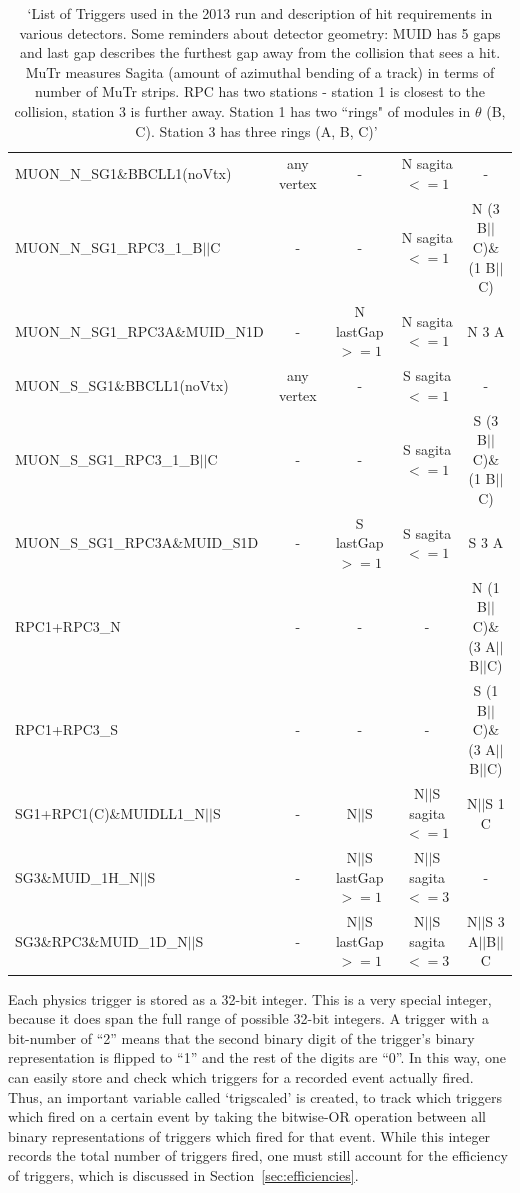 \begin{table}
{\begin{tabular}{l c c c c}
      MUON\_N\_SG1\&BBCLL1(noVtx) & any vertex & - & N sagita $<= 1$ & - \\
      MUON\_N\_SG1\_RPC3\_1\_B$||$C & - & - & N sagita $<= 1$ & N (3 B$||$C)\&(1 B$||$C) \\
      MUON\_N\_SG1\_RPC3A\&MUID\_N1D & - & N lastGap $>= 1$ & N sagita $<= 1$ & N 3 A \\
      MUON\_S\_SG1\&BBCLL1(noVtx) & any vertex & - & S sagita $<= 1$ & - \\
      MUON\_S\_SG1\_RPC3\_1\_B$||$C & - & - & S sagita $<= 1$ & S (3 B$||$C)\&(1 B$||$C) \\
      MUON\_S\_SG1\_RPC3A\&MUID\_S1D & - & S lastGap $>= 1$ & S sagita $<= 1$ & S 3 A \\
      RPC1+RPC3\_N & - & - & - & N (1 B$||$C)\&(3 A$||$B$||$C) \\
      RPC1+RPC3\_S & - & - & - & S (1 B$||$C)\&(3 A$||$B$||$C) \\
      SG1+RPC1(C)\&MUIDLL1\_N$||$S & - & N$||$S & N$||$S sagita $<= 1$ & N$||$S 1 C \\
      SG3\&MUID\_1H\_N$||$S & - & N$||$S lastGap $>= 1$ & N$||$S sagita $<= 3$ & - \\
      SG3\&RPC3\&MUID\_1D\_N$||$S & - & N$||$S lastGap $>= 1$ & N$||$S sagita $<= 3$ & N$||$S 3 A$||$B$||$C \\
      \bottomrule
    \end{tabular}
  }
  \caption{
    `List of Triggers used in the 2013 run and description of hit requirements
    in various detectors. Some reminders about detector geometry: MUID has 5
    gaps and last gap describes the furthest gap away from the collision that
    sees a hit. MuTr measures Sagita (amount of azimuthal bending of a track) in
    terms of number of MuTr strips. RPC has two stations - station 1 is closest
    to the collision, station 3 is further away. Station 1 has two ``rings" of
    modules in $\theta$ (B, C). Station 3 has three rings (A, B,
    C)'~\cite{Jumper2016}
  }
  \label{tab:typical_run}
\end{table}

Each physics trigger is stored as a 32-bit integer. This is a very special
integer, because it does span the full range of possible 32-bit integers. A
trigger with a bit-number of ``2'' means that the second binary digit of the
trigger's binary representation is flipped to ``1'' and the rest of the digits
are ``0''. In this way, one can easily store and check which triggers for a
recorded event actually fired. Thus, an important variable called `trigscaled'
is created, to track which triggers which fired on a certain event by taking the
bitwise-OR operation between all binary representations of triggers which fired
for that event. While this integer records the total number of triggers fired,
one must still account for the efficiency of triggers, which is discussed in
Section~\ref{sec:efficiencies}.

